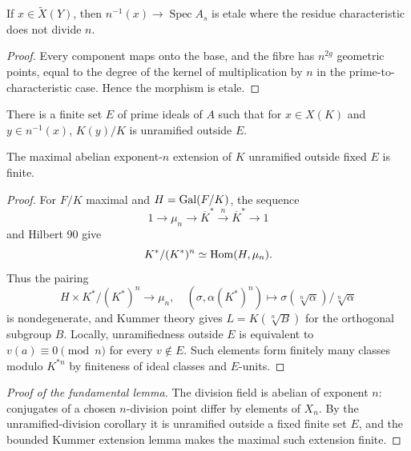 \begin{corollary}\label{mumford-cor-division-etale-integral-model}
If $x\in\widetilde X(Y)$, then $n^{-1}(x)\to\operatorname{Spec}A_s$ is etale
where the residue characteristic does not divide $n$.
\end{corollary}
\begin{proof}
Every component maps onto the base, and the fibre has $n^{2g}$ geometric
points, equal to the degree of the kernel of multiplication by $n$ in the
prime-to-characteristic case. Hence the morphism is etale.

\end{proof}
\begin{corollary}\label{mumford-cor-division-unramified}
There is a finite set $E$ of prime ideals of $A$ such that for $x\in X(K)$ and
$y\in n^{-1}(x)$, $K(y)/K$ is unramified outside $E$.
\end{corollary}

\begin{lemma}\label{mumford-lem-bounded-kummer-extensions}
The maximal abelian exponent-$n$ extension of $K$ unramified outside fixed $E$
is finite.
\end{lemma}
\begin{proof}
For $F/K$ maximal and $H={\rm Gal}(F/K)$, the sequence
\[
1\to\mu_n\to\overline K^*\xrightarrow{n}\overline K^*\to1
\]
and Hilbert 90 give
\[
K^*/(K^*)^n\simeq{\rm Hom}(H,\mu_n).
\]
Thus the pairing
\[
H\times K^*/(K^*)^n\to\mu_n,\quad
(\sigma,\alpha(K^*)^n)\mapsto\sigma(\sqrt[n]{\alpha})/\sqrt[n]{\alpha}\tag{3}
\]
is nondegenerate, and Kummer theory gives $L=K(\sqrt[n]{B})$ for the
orthogonal subgroup $B$. Locally, unramifiedness outside $E$ is equivalent to
$v(a)\equiv0\pmod n$ for every $v\notin E$. Such elements form finitely many
 classes modulo $K^{*n}$ by finiteness of ideal classes and $E$-units.

\end{proof}

\begin{proof}[Proof of the fundamental lemma]
The division field is abelian of exponent $n$: conjugates of a chosen
$n$-division point differ by elements of $X_n$. By the unramified-division
corollary it is unramified outside a fixed finite set $E$, and the bounded
Kummer extension lemma makes the maximal such extension finite.
\end{proof}

